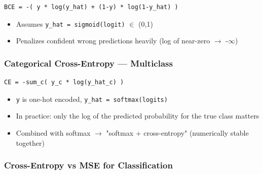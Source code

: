 \documentclass[11pt]{article}
\providecommand{\tightlist}{\setlength{\itemsep}{1pt}\setlength{\parskip}{0pt}}
\begin{document}
\begin{verbatim}
BCE = -( y * log(y_hat) + (1-y) * log(1-y_hat) )
\end{verbatim}

\begin{itemize}
\tightlist
\item
  Assumes \texttt{y\_hat\ =\ sigmoid(logit)} \(\in\) (0,1)
\item
  Penalizes confident wrong predictions heavily (log of near-zero \(\rightarrow\) -\(\infty\))
\end{itemize}

\subsubsection{Categorical Cross-Entropy --- Multiclass}\label{categorical-cross-entropy--multiclass}

\setcodelang{}

\begin{verbatim}
CE = -sum_c( y_c * log(y_hat_c) )
\end{verbatim}

\begin{itemize}
\tightlist
\item
  \texttt{y} is one-hot encoded, \texttt{y\_hat\ =\ softmax(logits)}
\item
  In practice: only the log of the predicted probability for the true class matters
\item
  Combined with softmax \(\rightarrow\) "softmax + cross-entropy" (numerically stable together)
\end{itemize}

\subsubsection{Cross-Entropy vs MSE for Classification}\label{cross-entropy-vs-mse-for-classification}
\end{document}
